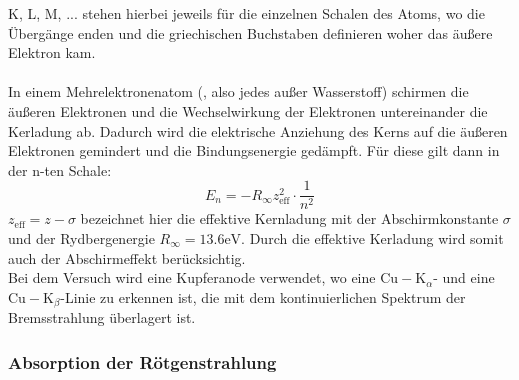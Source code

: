 K, L, M, ... stehen hierbei jeweils für die einzelnen Schalen des Atoms, wo die Übergänge
enden und die griechischen Buchstaben definieren woher das äußere Elektron kam.\\
\\
In einem Mehrelektronenatom (, also jedes außer Wasserstoff) schirmen die äußeren
Elektronen und die Wechselwirkung der Elektronen untereinander die Kerladung ab. Dadurch
wird die elektrische Anziehung des Kerns auf die äußeren Elektronen gemindert und die Bindungsenergie
gedämpft. Für diese gilt dann in der n-ten Schale:
\begin{equation}
    \label{eqn:Bindungsenergie}
    E_n = -R_{\infty} z_{\mathrm{eff}}^2 \cdot \frac{1}{n^2}
\end{equation}
$z_{\mathrm{eff}} = z - \sigma$ bezeichnet hier die effektive Kernladung mit der 
Abschirmkonstante $\sigma$ und der Rydbergenergie $R_{\infty} = 13.6 \si{\electronvolt}$.
Durch die effektive Kerladung wird somit auch der Abschirmeffekt berücksichtig.\\
Bei dem Versuch wird eine Kupferanode verwendet, wo eine $\mathrm{Cu-K}_\alpha$- und eine
$\mathrm{Cu-K}_\beta$-Linie zu erkennen ist, die mit dem kontinuierlichen Spektrum der
Bremsstrahlung überlagert ist.

\subsubsection{Absorption der Rötgenstrahlung}

